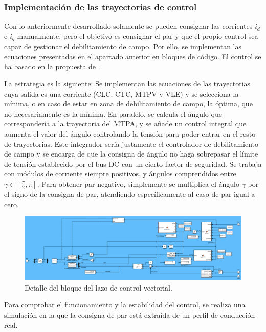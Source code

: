 \subsubsection{Implementación de las trayectorias de control}

Con lo anteriormente desarrollado solamente se pueden consignar las corrientes $i_d$ e $i_q$ manualmente, pero el objetivo es consignar el par y que el propio control sea capaz de gestionar el debilitamiento de campo. Por ello, se implementan las ecuaciones presentadas en el apartado anterior en bloques de código. El control se ha basado en la propuesta de \cite{carlos2023}.

La estrategia es la siguiente: Se implementan las ecuaciones de las trayectorias cuya salida es una corriente (CLC, CTC, MTPV y VLE) y se selecciona la mínima, o en caso de estar en zona de debilitamiento de campo, la óptima, que no necesariamente es la mínima. En paralelo, se calcula el ángulo que correspondería a la trayectoria del MTPA, y se añade un control integral que aumenta el valor del ángulo controlando la tensión para poder entrar en el resto de trayectorias. Este integrador sería justamente el controlador de debilitamiento de campo y se encarga de que la consigna de ángulo no haga sobrepasar el límite de tensión establecido por el bus DC con un cierto factor de seguridad. Se trabaja con módulos de corriente siempre positivos, y ángulos comprendidos entre $\gamma \in [\frac{\pi}{2}, \pi]$. Para obtener par negativo, simplemente se multiplica el ángulo $\gamma$ por el signo de la consigna de par, atendiendo específicamente al caso de par igual a cero.


\begin{figure}[H]
    \centering
    \includegraphics[width=1\linewidth]{fig/EMR_control.png}
    \caption{Detalle del bloque del lazo de control vectorial.}
    
\end{figure}
\newpage
Para comprobar el funcionamiento y la estabilidad del control, se realiza una simulación en la que la consigna de par está extraída de un perfil de conducción real.

